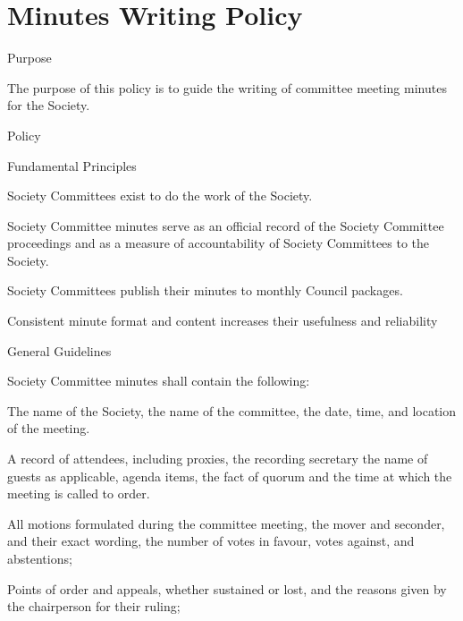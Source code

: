 \section{Minutes Writing Policy}
	\begin{longenum}[label*=\arabic*., align=left]
\item Purpose
	\begin{longenum}[label*=\arabic*., align=left]
\item The purpose of this policy is to guide the writing of committee meeting minutes for the Society.
	\end{longenum}
\item Policy
	\begin{longenum}[label*=\arabic*., align=left]
\item Fundamental Principles
	\begin{longenum}[label*=\arabic*., align=left]
		\item Society Committees exist to do the work of the Society.
		\item Society Committee minutes serve as an official record of the Society Committee proceedings and as a measure of accountability of Society Committees to the Society.
		\item Society Committees publish their minutes to monthly Council packages.
		\item Consistent minute format and content increases their usefulness and reliability
	\end{longenum}
\item General Guidelines
	\begin{longenum}[label*=\arabic*., align=left]
	\item Society Committee minutes shall contain the following:
	\begin{longenum}[label*=\arabic*., align=left]
		\item The name of the Society, the name of the committee, the date, time, and location of the meeting.
		\item A record of attendees, including proxies, the recording secretary  the name of guests as applicable, agenda items, the fact of quorum and the time at which the meeting is called to order.
    	\item All motions formulated during the committee meeting, the mover and seconder, and their exact wording, the number of votes in favour, votes against, and abstentions;
		\item Points of order and appeals, whether sustained or lost, and the reasons given by the chairperson for their ruling;

\end{longenum}
\end{longenum}
\end{longenum}
\end{longenum}
